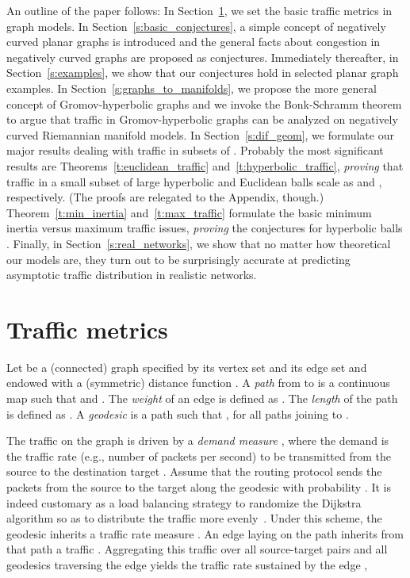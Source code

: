 \documentclass{article}
\begin{document}
An outline of the paper follows: 
In Section~\ref{s:basic_def}, 
we set the basic traffic metrics in graph models. 
In Section~\ref{s:basic_conjectures}, 
a simple concept of negatively curved planar graphs is introduced and 
the general facts about congestion in negatively curved graphs are proposed as conjectures.  
Immediately thereafter, in Section~\ref{s:examples}, 
we show that our conjectures hold 
in selected planar graph examples. In Section~\ref{s:graphs_to_manifolds}, 
we propose the more general concept of Gromov-hyperbolic graphs and 
we invoke the Bonk-Schramm theorem to argue that 
traffic in Gromov-hyperbolic graphs can be analyzed on negatively curved Riemannian manifold models. 
In Section~\ref{s:dif_geom}, we formulate our major results dealing with traffic in  
subsets of . 
Probably the most significant results are Theorems~\ref{t:euclidean_traffic} and~\ref{t:hyperbolic_traffic}, 
{\it proving} that traffic in a small subset  of large hyperbolic and Euclidean balls  scale 
as  and , respectively.  
(The proofs are relegated to the Appendix, though.)  
Theorem~\ref{t:min_inertia}
and~\ref{t:max_traffic} formulate the basic minimum inertia versus maximum traffic issues, 
{\it proving} the conjectures for hyperbolic balls .  
Finally, in Section~\ref{s:real_networks}, we show that no matter how theoretical our models are, 
they turn out to be surprisingly accurate at predicting asymptotic traffic distribution 
in realistic networks. 





\noindent 
\section{Traffic metrics}
\label{s:basic_def}



Let  be a (connected) graph specified by its vertex set  and its edge set  and endowed with a (symmetric) distance function . A \textit{path}  from  to  is a continuous map  such that  and . The \textit{weight} of an edge  is defined as . The \textit{length} of the path is defined as . A \textit{geodesic}  is a path such that , for all paths  joining  to . 

The traffic on the graph is driven by a \textit{demand measure }, where the demand  is the traffic rate (e.g., number of packets per second) to be transmitted from the source  to the destination target . Assume that the routing protocol sends the packets from the source  to the target  along the geodesic  with probability . It is indeed customary as a load balancing strategy to randomize the Dijkstra algorithm so as to distribute the traffic more evenly~\cite{mingjithesis,Cisco05}. Under this scheme, the geodesic  inherits a traffic rate measure . An edge  laying on the path  inherits from that path a traffic . Aggregating this traffic over all source-target pairs and all geodesics traversing the edge  yields the traffic rate sustained by the edge , 
 
\end{document}
